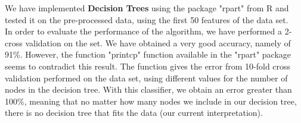 \documentclass[a4paper,11pt]{article}
\begin{document}
%
%

We have implemented \textbf{Decision Trees} using the package "rpart" from R and tested it on the pre-processed data, using the first 50 features of the data set. \\
\indent  In order to evaluate the performance of the algorithm, we have performed a 2-cross validation on the set. We have obtained a very good accuracy, namely of 91\%. However, the function "printcp" function available in the "rpart" package seems to contradict this result. The function gives the error from 10-fold cross validation performed on the data set, using different values for the number of nodes in the decision tree. With this classifier, we obtain an error greater than 100\%, meaning that no matter how many nodes we include in our decision tree, there is no decision tree that fits the data (our current interpretation).
\end{document}
